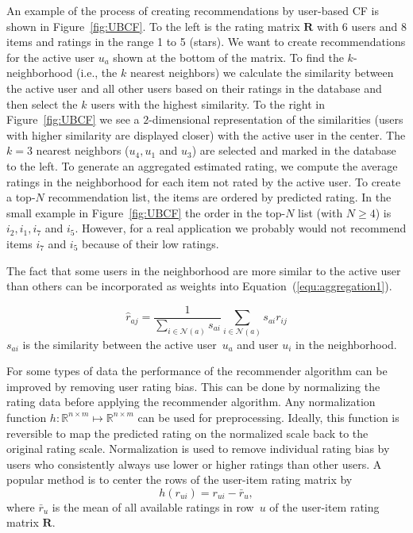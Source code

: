 \documentclass[nojss]{jss}
\newcommand{\set}[1]{\mathcal{#1}}
\newcommand{\mat}[1]{{\mathbf{#1}}}
\begin{document}
An example of the process of creating recommendations by
user-based CF is shown in Figure~\ref{fig:UBCF}. To the left is the rating
matrix $\mat{R}$ with 6 users and 8 items and ratings in the
range 1 to 5 (stars).
We want to create recommendations for the active user $u_a$
shown at the bottom of the matrix.  To find the
$k$-neighborhood (i.e., the $k$ nearest neighbors) we calculate the similarity
between the active user and all other users
based on their ratings
in the database and then select the
$k$ users with the highest similarity. To the right in Figure~\ref{fig:UBCF}
we see a $2$-dimensional representation of the similarities (users with higher
similarity are displayed closer) with the active user in the center.
The $k=3$ nearest
neighbors ($u_4, u_1$ and $u_3$) are selected and marked in the
database to the left. To generate an
aggregated estimated rating, we
compute the average ratings in the neighborhood for each item not
rated by the active user.
To create a top-$N$ recommendation list, the items are ordered by
predicted rating.
In the small example in
Figure~\ref{fig:UBCF} the order in the top-$N$ list (with $N \ge 4$)
is $i_2, i_1, i_7$ and $i_5$. However, for a real application we
probably would
not recommend items $i_7$ and $i_5$ because of their low ratings.

The fact that some users in the neighborhood are more similar to
the active user than others can be
incorporated as weights into
Equation~(\ref{equ:aggregation1}).

\begin{equation}
\hat{r}_{aj}=\frac{1}{\sum_{i\in\set{N}(a)} s_{ai}} \sum_{i\in\set{N}(a)} s_{ai} r_{ij}
\label{equ:aggregation2}
\end{equation}
$s_{ai}$ is the similarity between the active user~$u_a$ and user
$u_i$ in the neighborhood.

For some types of data the performance of the recommender algorithm can
be improved by removing user rating bias.
This can be done by normalizing the rating data before applying the
recommender algorithm.
Any normalization
function $h: \mathbb{R}^{n \times m} \mapsto \mathbb{R}^{n \times m}$
can be used for preprocessing. Ideally, this function is reversible
to map the predicted rating on the normalized scale back
to the original rating scale.
Normalization is used to remove individual rating bias by
users who consistently always use lower or higher
ratings than other users.
A popular method is to center the rows of the user-item rating matrix
by
$$h(r_{ui}) = r_{ui} - \bar{r}_u,$$
where $\bar{r}_u$ is the mean of all available ratings in row~$u$ of
the user-item rating matrix $\mat{R}$.
\end{document}

